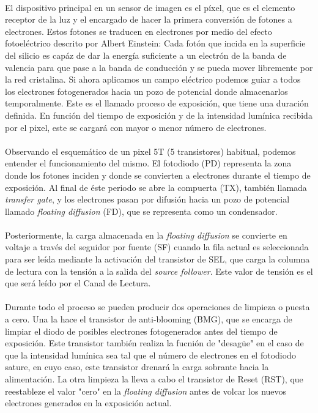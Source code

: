 \documentclass[12pt,a4paper,oneside,titlepage]{report}
\begin{document}
\paragraph{}
El dispositivo principal en un sensor de imagen es el píxel, que es el elemento
receptor de la luz y el encargado de hacer la primera conversión de fotones a
electrones. Estos fotones se traducen en electrones por medio del efecto fotoeléctrico
descrito por Albert Einstein: Cada fotón que incida en la superficie del silicio
es capáz de dar la energía suficiente a un electrón de la banda de valencia para que
pase a la banda de conducción y se pueda mover libremente por la red cristalina.
Si ahora aplicamos un campo eléctrico podemos guiar a todos los electrones
fotogenerados hacia un pozo de potencial donde almacenarlos temporalmente. Este
es el llamado proceso de exposición, que tiene una duración definida. En función
del tiempo de exposición y de la intensidad lumínica recibida por el pixel, este
se cargará con mayor o menor número de electrones.

\paragraph{}
Observando el esquemático de un pixel 5T (5 transistores) habitual, podemos entender
el funcionamiento del mismo. El fotodiodo (PD) representa la zona donde los fotones
inciden y donde se convierten a electrones durante el tiempo de exposición. Al final
de éste periodo se abre la compuerta (TX), también llamada \textit{transfer gate},
y los electrones pasan por difusión hacia un pozo de potencial llamado \textit{floating
diffusion} (FD), que se representa como un condensador.

\paragraph{}
Posteriormente, la carga almacenada en la \textit{floating diffusion} se convierte
en voltaje a través del seguidor por fuente (SF) cuando la fila actual es seleccionada
para ser leída mediante la activación del transistor de SEL, que carga la columna
de lectura con la tensión a la salida del \textit{source follower}. Este valor de
tensión es el que será leído por el Canal de Lectura.

\paragraph{}
Durante todo el proceso
se pueden producir dos operaciones de limpieza o puesta a cero. Una la hace el
transistor de anti-blooming (BMG), que se encarga de limpiar el diodo de posibles
electrones fotogenerados antes del tiempo de exposición. Este transistor también
realiza la fucnión de "desagüe" en el caso de que la intensidad lumínica sea tal
que el número de electrones en el fotodiodo sature, en cuyo caso, este transistor
drenará la carga sobrante hacia la alimentación. La otra limpieza la
lleva a cabo el transistor de Reset (RST), que reestableze el valor "cero" en la
 \textit{floating diffusion} antes de volcar los nuevos electrones generados en
 la exposición actual.
\end{document}
